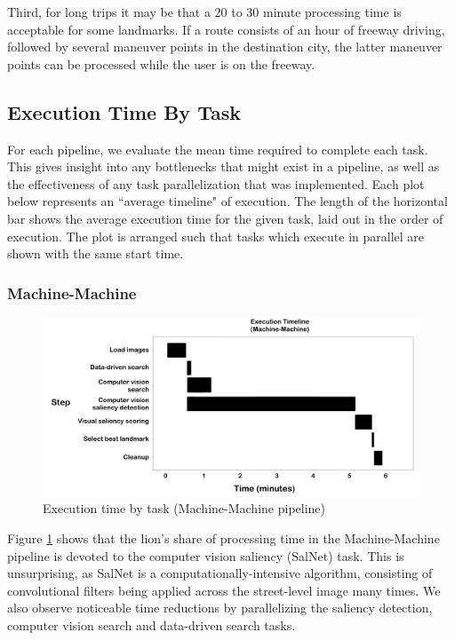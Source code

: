 Third, for long trips it may be that a 20 to 30 minute processing time is acceptable for some landmarks. If a route consists of an hour of freeway driving, followed by several maneuver points in the destination city, the latter maneuver points can be processed while the user is on the freeway.

\subsection{Execution Time By Task}

For each pipeline, we evaluate the mean time required to complete each task. This gives insight into any bottlenecks that might exist in a pipeline, as well as the effectiveness of any task parallelization that was implemented. Each plot below represents an ``average timeline" of execution. The length of the horizontal bar shows the average execution time for the given task, laid out in the order of execution. The plot is arranged such that tasks which execute in parallel are shown with the same start time.

\subsubsection{Machine-Machine}
\begin{figure}[htbp]
  \centering
  \includegraphics[width=\textwidth]{images/timeline_mm.pdf}
  \caption{Execution time by task (Machine-Machine pipeline)}
  \label{fig:plot:timeline:mm}
\end{figure}

Figure \ref{fig:plot:timeline:mm} shows that the lion's share of processing time in the Machine-Machine pipeline is devoted to the computer vision saliency (SalNet) task. This is unsurprising, as SalNet is a computationally-intensive algorithm, consisting of convolutional filters being applied across the street-level image many times. We also observe noticeable time reductions by parallelizing the saliency detection, computer vision search and data-driven search tasks.

